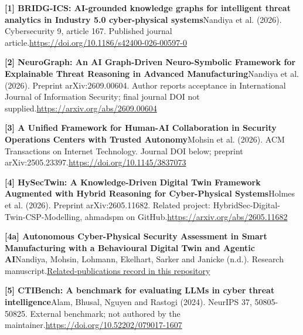 \textbf{[1] BRIDG-ICS: AI-grounded knowledge graphs for intelligent threat analytics in Industry 5.0 cyber-physical systems}\newline Nandiya et al. (2026). Cybersecurity 9, article 167. Published journal article.\newline \href{https://doi.org/10.1186/s42400-026-00597-0}{https://doi.org/10.1186/s42400-026-00597-0}

\textbf{[2] NeuroGraph: An AI Graph-Driven Neuro-Symbolic Framework for Explainable Threat Reasoning in Advanced Manufacturing}\newline Nandiya et al. (2026). Preprint arXiv:2609.00604. Author reports acceptance in International Journal of Information Security; final journal DOI not supplied.\newline \href{https://arxiv.org/abs/2609.00604}{https://arxiv.org/abs/2609.00604}

\textbf{[3] A Unified Framework for Human-AI Collaboration in Security Operations Centers with Trusted Autonomy}\newline Mohsin et al. (2026). ACM Transactions on Internet Technology. Journal DOI below; preprint arXiv:2505.23397.\newline \href{https://doi.org/10.1145/3837073}{https://doi.org/10.1145/3837073}

\textbf{[4] HySecTwin: A Knowledge-Driven Digital Twin Framework Augmented with Hybrid Reasoning for Cyber-Physical Systems}\newline Holmes et al. (2026). Preprint arXiv:2605.11682. Related project: HybridSec-Digital-Twin-CSP-Modelling, ahmadspm on GitHub.\newline \href{https://arxiv.org/abs/2605.11682}{https://arxiv.org/abs/2605.11682}

\textbf{[4a] Autonomous Cyber-Physical Security Assessment in Smart Manufacturing with a Behavioural Digital Twin and Agentic AI}\newline Nandiya, Mohsin, Lohmann, Ekelhart, Sarker and Janicke (n.d.). Research manuscript.\newline \href{https://github.com/ahmadspm/industrial-cps-security-datasets/blob/main/docs/RELATED_PUBLICATIONS.md}{Related-publications record in this repository}

\textbf{[5] CTIBench: A benchmark for evaluating LLMs in cyber threat intelligence}\newline Alam, Bhusal, Nguyen and Rastogi (2024). NeurIPS 37, 50805-50825. External benchmark; not authored by the maintainer.\newline \href{https://doi.org/10.52202/079017-1607}{https://doi.org/10.52202/079017-1607}


